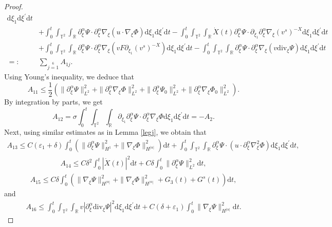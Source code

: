 \documentclass[10pt,reqno]{amsart}
\numberwithin{equation}{section}
\newcommand{\dif}{\mathrm{d}}
\newcommand{\ddiv}{\mathrm{div}}
\begin{document}
\begin{proof}
\begin{align*}
\dif \xi_1\dif \xi^{\prime}\dif t\\
&
+\int_0^t\int_{\mathbb{T}^2}\int_{\mathbb{R}}
\partial_\xi^\alpha\Psi\cdot\partial_\xi^\alpha\nabla_\xi\left(u\cdot\nabla_\xi\Phi\right)
\dif \xi_1\dif \xi^{\prime}\dif t
-\int_0^t\int_{\mathbb{T}^2}\int_{\mathbb{R}}\dot X(t)
\partial_\xi^\alpha\Psi\cdot\partial_{\xi_1}\partial_\xi^\alpha\nabla_\xi(v^s)^{-X}
\dif \xi_1\dif \xi^{\prime}\dif t\\
&
+\int_0^t\int_{\mathbb{T}^2}\int_{\mathbb{R}}
\partial_\xi^\alpha\Psi\cdot\partial_\xi^\alpha\nabla_\xi\left(vF\partial_{\xi_1}(v^s)^{-X}\right)
\dif \xi_1\dif \xi^{\prime}\dif t
-\int_0^t\int_{\mathbb{T}^2}\int_{\mathbb{R}}
\partial_\xi^\alpha\Psi\cdot\partial_\xi^\alpha\nabla_\xi\left(v\ddiv_\xi\Psi\right)
\dif \xi_1\dif \xi^{\prime}\dif t\\
=:&\sum\limits_{j=1}\limits^6A_{1j}.
\end{align*}
Using Young's inequality, we deduce that
\[
A_{11}\le \frac{1}{2}\left(\|\partial_\xi^\alpha\Psi\|_{L^2}^2+\|\partial_\xi^\alpha\nabla_\xi\Phi\|_{L^2}^2
+\|\partial_\xi^\alpha\Psi_0\|_{L^2}^2+\|\partial_\xi^\alpha\nabla_\xi\Phi_0\|_{L^2}^2\right).
\]
By integration by parts, we get
\[
A_{12}=\sigma\int_0^t\int_{\mathbb{T}^2}\int_{\mathbb{R}}
\partial_{\xi_1}\partial_\xi^\alpha\Psi\cdot\partial_\xi^\alpha\nabla_\xi\Phi
\dif \xi_1\dif \xi^{\prime}\dif t
=-A_2.
\]
Next, using similar estimates as in Lemma \ref{legj}, we obtain that
\begin{align*}
A_{13}\le C(\varepsilon_1+\delta)\int_0^t\left(\|\partial_\xi^\alpha\Psi\|_{H^1}^2+\|\nabla_\xi\Phi\|_{H^{|\alpha|}}^2\right)\dif t
+\int_0^t\int_{\mathbb{T}^2}\int_{\mathbb{R}}\partial_\xi^\alpha\Psi\cdot\left(u\cdot\partial_\xi^\alpha\nabla_\xi^2\Phi\right)
\dif \xi_1\dif \xi^{\prime}\dif t,
\end{align*}
\begin{align*}
A_{14}
\le C\delta^2\int_0^t|\dot X(t)|^2\dif t+C\delta\int_0^t\|\partial_\xi^\alpha\Psi\|_{L^2}^2\dif t,
\end{align*}
\begin{align*}
A_{15}\le C\delta\int_0^t\left(\|\nabla_\xi\Psi\|_{H^{|\alpha|}}^2+\|\nabla_\xi\Phi\|_{H^{|\alpha|}}^2+G_3(t)+G^s(t)\right)
\dif t,
\end{align*}
and
\begin{align*}
A_{16}
\le \int_0^t\int_{\mathbb{T}^2}\int_{\mathbb{R}}
v|\partial_\xi^\alpha\ddiv_\xi\Psi|^2
\dif \xi_1\dif \xi^{\prime}\dif t
+C(\delta+\varepsilon_1)\int_0^t\|\nabla_\xi\Psi\|_{H^{|\alpha|}}^2\dif t.
\end{align*}

\end{proof}
\end{document}
